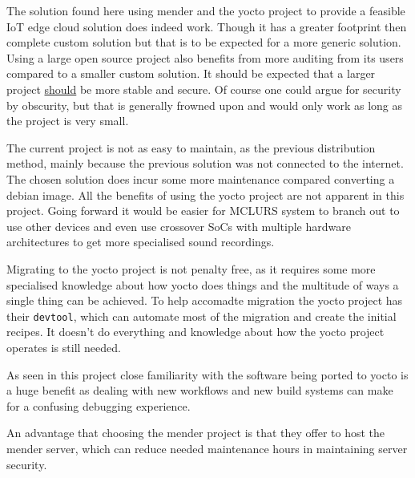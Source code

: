 \documentclass[../../main.tex]{subfiles}
\begin{document}
The solution found here using mender and the yocto project to provide a feasible IoT edge cloud
solution does indeed work. Though it has a greater footprint then complete custom solution but that
is to be expected for a more generic solution. Using a large open source project  also benefits
from more auditing from its users compared to a smaller custom solution.
It should be expected that a larger project \underline{should} be more stable and secure.
Of course one could argue for security by obscurity, but that is generally frowned upon and would
only work as long as the project is very small.


The current project is not as easy to maintain, as the previous distribution method, mainly
because the previous solution was not connected to the internet. The chosen solution does incur
some more maintenance compared converting a debian image.
All the benefits of using the yocto project are not apparent in this project. Going forward
it would be easier for MCLURS system to branch out to use other devices and even use crossover
SoCs with multiple hardware architectures to get more specialised sound recordings.



Migrating to the yocto project is not penalty free, as it requires some more specialised knowledge
about how yocto does things and the multitude of ways a single thing can be achieved.
To help accomadte migration the yocto project has their \texttt{devtool}, which can automate 
most of the migration and create the initial recipes. It doesn't do everything and knowledge about
how the yocto project operates is still needed.

As seen in this project close familiarity with the software being ported to yocto is a huge benefit
as dealing with new workflows and new build systems can make for a confusing debugging experience.

An advantage that choosing the mender project is that they offer to host the mender server, which
can reduce needed maintenance hours in maintaining server security.
\end{document}
